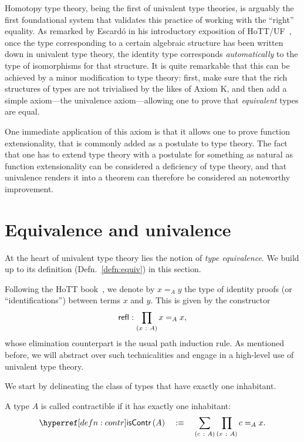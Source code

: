Homotopy type theory, being the first of univalent type theories, is arguably the first
foundational system that validates this practice of working with the ``right'' equality.
As remarked by Escardó in his introductory exposition of HoTT/UF~\cite{escardo-uf-intro},
once the type corresponding to a certain algebraic structure has been written down in
univalent type theory, the identity type corresponds \emph{automatically} to the type of
isomorphisms for that structure. It is quite remarkable that this can be achieved by a
minor modification to type theory: first, make sure that the rich structures of types are
not trivialised by the likes of Axiom K, and then add a simple axiom---the univalence
axiom---allowing one to prove that \emph{equivalent} types are equal.

One immediate application of this axiom is that it allows one to prove function
extensionality, that is commonly added as a postulate to type theory. The fact that one
has to extend type theory with a postulate for something as natural as function
extensionality can be considered a deficiency of type theory, and that univalence renders
it into a theorem can therefore be considered an noteworthy improvement.

\section{Equivalence and univalence}

At the heart of univalent type theory lies the notion of \emph{type equivalence}. We build
up to its definition (Defn.~\ref{defn:equiv}) in this section.

Following the HoTT book~\cite[Sec.~I.1.12]{hottbook}, we denote by $x =_A y$ the type of
identity proofs (or ``identifications'') between terms $x$ and $y$. This is given by the
constructor $$\mathsf{refl}\hspace{0.1mm}:\hspace{0.1mm}\prod_{(x~:~A)} x =_A x,$$ whose elimination counterpart
is the usual path induction rule. As mentioned before, we will abstract over such
technicalities and engage in a high-level use of univalent type theory.

We start by delineating the class of types that have exactly one inhabitant.
\begin{defn}[Contractible]\label{defn:contr}
  A type $A$ is called contractible if it has exactly one inhabitant:
  \begin{equation*}
    \iscontr{A} \quad\is\quad \sigmaty{c}{A}{\pity{x}{A}{c =_A x}}.
  \end{equation*}
\end{defn}

